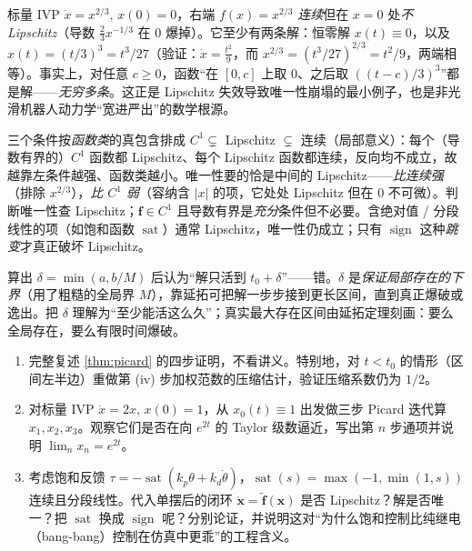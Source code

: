 \begin{example}[连续不保证唯一：$\dot x=x^{2/3}$]\label{ex:nonunique}
标量 IVP $\dot x=x^{2/3},\,x(0)=0$，右端 $f(x)=x^{2/3}$ \emph{连续}但在 $x=0$ 处\emph{不 Lipschitz}（导数 $\tfrac23 x^{-1/3}$ 在 $0$ 爆掉）。它至少有两条解：恒零解 $x(t)\equiv0$，以及 $x(t)=(t/3)^3=t^3/27$（验证：$\dot x=\tfrac{t^2}{9}$，而 $x^{2/3}=(t^3/27)^{2/3}=t^2/9$，两端相等）。事实上，对任意 $c\ge0$，函数“在 $[0,c]$ 上取 $0$、之后取 $((t-c)/3)^3$”都是解——\emph{无穷多条}。这正是 Lipschitz 失效导致唯一性崩塌的最小例子，也是非光滑机器人动力学“宽进严出”的数学根源。
\end{example}

\begin{pitfall}
三个条件按\emph{函数类}的真包含排成 $C^1\subsetneq$ Lipschitz $\subsetneq$ 连续（局部意义）：每个（导数有界的）$C^1$ 函数都 Lipschitz、每个 Lipschitz 函数都连续，反向均不成立，故越靠左条件越强、函数类越小。唯一性要的恰是中间的 Lipschitz——\emph{比连续强}（排除 $x^{2/3}$），\emph{比 $C^1$ 弱}（容纳含 $|x|$ 的项，它处处 Lipschitz 但在 $0$ 不可微）。判断唯一性查 Lipschitz；$\mathbf{f}\in C^1$ 且导数有界是\emph{充分}条件但不必要。含绝对值 / 分段线性的项（如饱和函数 $\operatorname{sat}$）通常 Lipschitz，唯一性仍成立；只有 $\operatorname{sign}$ 这种\emph{跳变}才真正破坏 Lipschitz。
\end{pitfall}

\begin{pitfall}
算出 $\delta=\min(a,b/M)$ 后认为“解只活到 $t_0+\delta$”——错。$\delta$ 是\emph{保证局部存在的下界}（用了粗糙的全局界 $M$），靠延拓可把解一步步接到更长区间，直到真正爆破或逸出。把 $\delta$ 理解为“至少能活这么久”；真实最大存在区间由延拓定理刻画：要么全局存在，要么有限时间爆破。
\end{pitfall}

\begin{practice}
\begin{enumerate}
  \item 完整复述 \cref{thm:picard} 的四步证明，不看讲义。特别地，对 $t<t_0$ 的情形（区间左半边）重做第 (iv) 步加权范数的压缩估计，验证压缩系数仍为 $1/2$。
  \item 对标量 IVP $\dot x=2x,\,x(0)=1$，从 $x_0(t)\equiv1$ 出发做三步 Picard 迭代算 $x_1,x_2,x_3$。观察它们是否在向 $e^{2t}$ 的 Taylor 级数逼近，写出第 $n$ 步通项并说明 $\lim_n x_n=e^{2t}$。
  \item 考虑饱和反馈 $\tau=-\operatorname{sat}(k_p\theta+k_d\dot\theta)$，$\operatorname{sat}(s)=\max(-1,\min(1,s))$ 连续且分段线性。代入单摆后的闭环 $\dot{\mathbf{x}}=\tilde{\mathbf{f}}(\mathbf{x})$ 是否 Lipschitz？解是否唯一？把 $\operatorname{sat}$ 换成 $\operatorname{sign}$ 呢？分别论证，并说明这对“为什么饱和控制比纯继电（bang-bang）控制在仿真中更乖”的工程含义。
\end{enumerate}
\end{practice}

